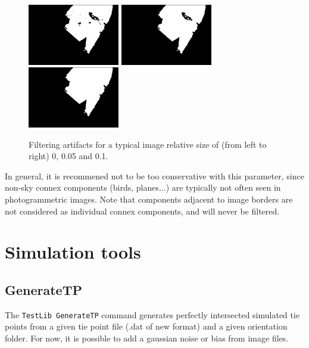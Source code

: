 \begin{itemize}
		\begin{figure}[!h]
		\begin{center}
			\includegraphics[width=40mm]{FIGS/SkyMask/im_px_0.JPG}
			\includegraphics[width=40mm]{FIGS/SkyMask/im_px_005.JPG}
			\includegraphics[width=40mm]{FIGS/SkyMask/im_px_01.JPG}
			\caption{Filtering artifacts for a typical image relative size of (from left to right) 0, 0.05 and 0.1.}
		\end{center}	
	\end{figure}

	In general, it is recommened not to be too conservative with this parameter, since non-sky connex components (birds, planes...) are typically not often seen in photogrammetric images. Note that components adjacent to image borders are not considered as individual connex components, and will never be filtered. \newline
	
\end{itemize}


\section{Simulation tools}
\subsection{GenerateTP}
The {\tt TestLib GenerateTP} command generates perfectly intersected simulated tie points from a given tie point file (.dat of new format) and a given orientation folder. For now, it is possible to add a gaussian noise or bias from image files.

